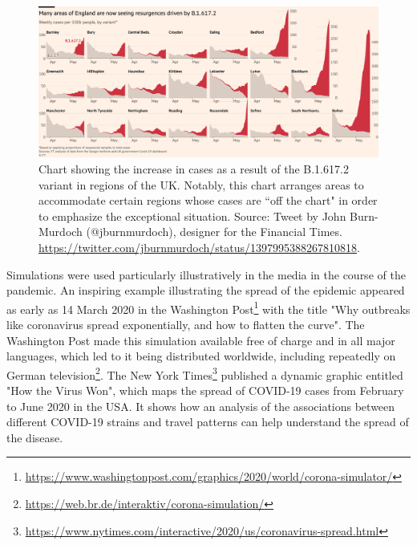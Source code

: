 \documentclass[article]{jdssv}\usepackage[]{graphicx}\usepackage[]{color}
\begin{document}
\begin{figure}
\includegraphics[width=.99\linewidth]{ft-off-charts}
\caption{Chart showing the increase in cases as a result of the B.1.617.2 variant in regions of the UK. Notably, this chart arranges areas to accommodate certain regions whose cases are ``off the chart" in order to emphasize the exceptional situation. Source: Tweet by John Burn-Murdoch (@jburnmurdoch), designer for the Financial Times. \url{https://twitter.com/jburnmurdoch/status/1397995388267810818}.}
\label{fig:jbm-tweet}
\end{figure}



Simulations were used particularly illustratively in the media in the course of the pandemic. An inspiring example illustrating the spread of the epidemic appeared as early as 14 March 2020 in the Washington Post\footnote{\url{https://www.washingtonpost.com/graphics/2020/world/corona-simulator/}} with the title "Why outbreaks like coronavirus spread exponentially, and how to flatten the curve". The Washington Post made this simulation available free of charge and in all major languages, which led to it being distributed worldwide, including repeatedly on German television\footnote{\url{https://web.br.de/interaktiv/corona-simulation/}}. The New York Times\footnote{\url{https://www.nytimes.com/interactive/2020/us/coronavirus-spread.html}} published a dynamic graphic entitled "How the Virus Won", which maps the spread of COVID-19 cases from February to June 2020 in the USA. It shows how an analysis of the associations between different COVID-19 strains and travel patterns can help understand the spread of the disease.
\end{document}
